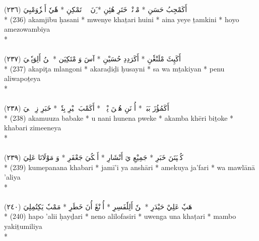 \documentclass[a4paper, 12pt]{report}
\begin{document}
\begin{center}
\textarabic{(٢٣٦) \textcolor{mygreen}{أَكَمْجِبُ حَسَنِ  * مْوٖنْيٖ خَتَرِ هُئِنِ  * َِنَ يٖيٖ تَمْكِنِ  * هٗيٗ أَمٖزٗوَمْبِيَ }} \\* 
(236) akamjibu ḥasani  * mwenye khaṯari huini  * aina yeye ṯamkini  * hoyo amezowambiya  \\* 
 \\ 
\\[8mm] 

\textarabic{(٢٣٧) \textcolor{mygreen}{أَكَپِٹَ مْلَنْڠٗنِ  * أَكَرَدِدِ حُسَيْنِ  * آسَ وَ مْتَكِيَن  * پٖنُ أَلِوَپٗتٖيَ }} \\* 
(237) akapiţa mlangoni  * akaraḏiḏi ḥusayni  * sa wa mṯakiyan  * penu aliwapoṯeya  \\* 
 \\ 
\\[8mm] 

\textarabic{(٢٣٨) \textcolor{mygreen}{أَكَمُؤُزَ بَبَكٖ  * أُ نَنِ هُنٖنَ پْوٖكٖ  * أَكَمْبَ خٖيْرِ بِتٗكٖ  * خَبَرِ زِمٖئٖنٖيَ }} \\* 
(238) akamuuza babake  * u nani hunena pweke  * akamba khēri biṯoke  * khabari zimeeneya  \\* 
 \\ 
\\[8mm] 

\textarabic{(٢٣٩) \textcolor{mygreen}{كُمٖپَنَنَ خَبَرِ  * جَمِيْعِ يَ أَنْشَارِ  * أَمٖكُيَ جَعْفَرِ  * وَ مَوْلَانَا عَلِيَ }} \\* 
(239) kumepanana khabari  * jamī'i ya anshāri  * amekuya ja'fari  * wa mawlānā 'aliya  \\* 
 \\ 
\\[8mm] 

\textarabic{(٢٤٠) \textcolor{mygreen}{هَپٗ عَلِيْ حَيْدَرِ  * نٖنٗ أَلِلٗفَسِرِ  * أُوٖنْڠَ أُنَ خَطَرِ  * مَمْبٗ يَكِتُمِلِيَ }} \\* 
(240) hapo 'alii ḥayḏari  * neno alilofasiri  * uwenga una khaṭari  * mambo yakiṯumiliya  \\* 
 \\ 
\\[8mm] 


\end{center}
\end{document}
